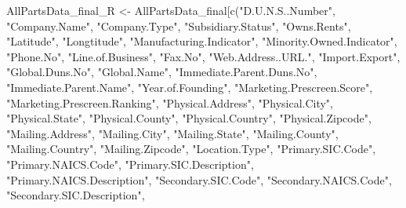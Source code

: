 AllPartsData_final_R <- AllPartsData_final[c("D.U.N.S..Number",
                                             "Company.Name",
                                             "Company.Type",
                                             "Subsidiary.Status",
                                             "Owns.Rents",
                                             "Latitude",
                                             "Longtitude",
                                             "Manufacturing.Indicator",
                                             "Minority.Owned.Indicator",
                                             "Phone.No",
                                             "Line.of.Business",
                                             "Fax.No",
                                             "Web.Address..URL.",
                                             "Import.Export",
                                             "Global.Duns.No",
                                             "Global.Name",
                                             "Immediate.Parent.Duns.No",
                                             "Immediate.Parent.Name",
                                             "Year.of.Founding",
                                             "Marketing.Prescreen.Score",
                                             "Marketing.Prescreen.Ranking",
                                             "Physical.Address",
                                             "Physical.City",
                                             "Physical.State",
                                             "Physical.County",
                                             "Physical.Country",
                                             "Physical.Zipcode",
                                             "Mailing.Address",
                                             "Mailing.City",
                                             "Mailing.State",
                                             "Mailing.County",
                                             "Mailing.Country",
                                             "Mailing.Zipcode",
                                             "Location.Type",
                                             "Primary.SIC.Code",
                                             "Primary.NAICS.Code",
                                             "Primary.SIC.Description",
                                             "Primary.NAICS.Description",
                                             "Secondary.SIC.Code",
                                             "Secondary.NAICS.Code",
                                             "Secondary.SIC.Description",

